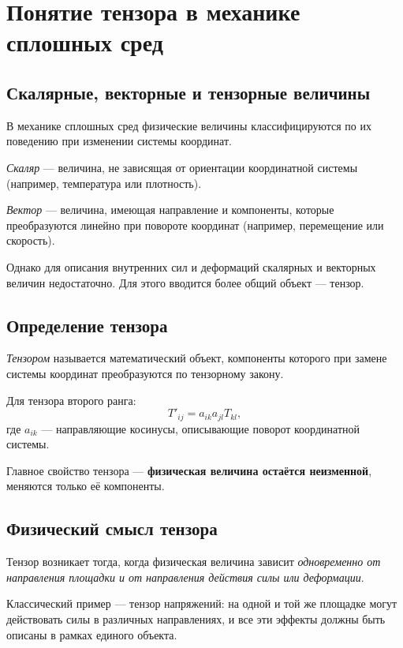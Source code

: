 

\section{Понятие тензора в механике сплошных сред}

\subsection{Скалярные, векторные и тензорные величины}

В механике сплошных сред физические величины
классифицируются по их поведению при изменении системы координат.

\textit{Скаляр} — величина, не зависящая от ориентации координатной системы
(например, температура или плотность).

\textit{Вектор} — величина, имеющая направление и компоненты,
которые преобразуются линейно при повороте координат
(например, перемещение или скорость).

Однако для описания внутренних сил и деформаций
скалярных и векторных величин недостаточно.
Для этого вводится более общий объект — тензор.

\subsection{Определение тензора}

\textit{Тензором} называется математический объект,
компоненты которого при замене системы координат
преобразуются по тензорному закону.

Для тензора второго ранга:
\begin{equation}
T'_{ij} = a_{ik} a_{jl} T_{kl},
\end{equation}
где $a_{ik}$ — направляющие косинусы,
описывающие поворот координатной системы.

Главное свойство тензора —
\textbf{физическая величина остаётся неизменной},
меняются только её компоненты.

\subsection{Физический смысл тензора}

Тензор возникает тогда,
    когда физическая величина зависит
\textit{одновременно от направления площадки
и от направления действия силы или деформации}.

Классический пример —
тензор напряжений:
на одной и той же площадке
могут действовать силы в различных направлениях,
и все эти эффекты должны быть описаны в рамках единого объекта.

